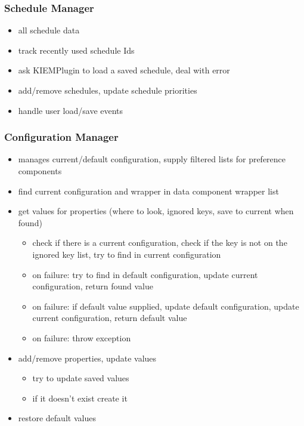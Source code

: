 \subsubsection{Schedule Manager}
\begin{itemize}
 \item all schedule data
 \item track recently used schedule Ids
 \item ask KIEMPlugin to load a saved schedule, deal with error
 \item add/remove schedules, update schedule priorities
 \item handle user load/save events
\end{itemize}

\subsubsection{Configuration Manager}
\begin{itemize}
 \item manages current/default configuration, supply filtered lists for preference components
 \item find current configuration and wrapper in data component wrapper list 
 \item get values for properties (where to look, ignored keys, save to current when found)
  \begin{itemize}
   \item check if there is a current configuration, check if the key is not on the ignored key list, try to find in current configuration
   \item on failure: try to find in default configuration, update current configuration, return found value
   \item on failure: if default value supplied, update default configuration, update current configuration, return default value
   \item on failure: throw exception
  \end{itemize}
 \item add/remove properties, update values
 \begin{itemize}
  \item try to update saved values
  \item if it doesn't exist create it
 \end{itemize}
 \item restore default values
\end{itemize}

